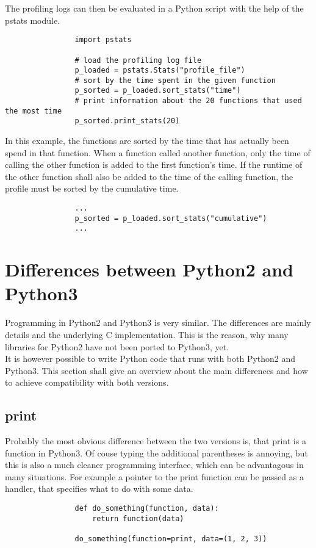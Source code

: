 			The profiling logs can then be evaluated in a Python script with the help of the {\normalfont \ttfamily pstats} module.
			\begin{verbatim}
				import pstats

				# load the profiling log file
				p_loaded = pstats.Stats("profile_file")
				# sort by the time spent in the given function
				p_sorted = p_loaded.sort_stats("time")
				# print information about the 20 functions that used the most time
				p_sorted.print_stats(20)
			\end{verbatim}
			In this example, the functions are sorted by the time that has actually been spend in that function.
			When a function called another function, only the time of calling the other function is added to the first function's time.
			If the runtime of the other function shall also be added to the time of the calling function, the profile must be sorted by the cumulative time.
			\begin{verbatim}
				...
				p_sorted = p_loaded.sort_stats("cumulative")
				...
			\end{verbatim}


	\section{Differences between Python2 and Python3}
		Programming in Python2 and Python3 is very similar.
		The differences are mainly details and the underlying C implementation.
		This is the reason, why many libraries for Python2 have not been ported to Python3, yet.\\
		It is however possible to write Python code that runs with both Python2 and Python3.
		This section shall give an overview about the main differences and how to achieve compatibility with both versions.

		\subsection{print}
			Probably the most obvious difference between the two versions is, that {\normalfont \ttfamily print} is a function in Python3.
			Of couse typing the additional parentheses is annoying, but this is also a much cleaner programming interface, which can be advantagous in many situations.
			For example a pointer to the {\normalfont \ttfamily print} function can be passed as a handler, that specifies what to do with some data.
			\begin{verbatim}
				def do_something(function, data):
					return function(data)

				do_something(function=print, data=(1, 2, 3))
			\end{verbatim}

